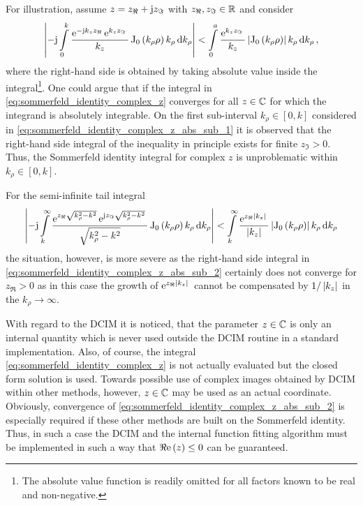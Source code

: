 For illustration, assume $z = z_\Re + \mathrm{j} z_\Im$ with $z_\Re, z_\Im \in \mathbb{R}$ and
consider
\begin{equation}\label{eq:sommerfeld_identity_complex_z_abs_sub_1}
	\left\vert
	-\mathrm{j}
	\int\limits_{0}^{k} 
	\frac{\mathrm{e}^{-\mathrm{j} k_z z_\Re}\, \mathrm{e}^{k_z z_\Im}\,}{k_z}
	\operatorname{J}_{0} \left(k_\rho \rho\right)
	k_\rho 
	\,
	\mathrm{d} k_\rho
	\right\vert
	<
	\int\limits_{0}^{a} 
	\frac{\mathrm{e}^{k_z z_\Im}\,}{k_z}
	\left\vert
	\operatorname{J}_{0} \left(k_\rho \rho\right)
	\right\vert
	k_\rho 
	\,
	\mathrm{d} k_\rho
	\, ,
\end{equation}
where the right-hand side is obtained by taking absolute value inside the
integral\footnote{The absolute value function is readily omitted for all factors
known to be real and non-negative.}.
One could argue that if the integral in
\eqref{eq:sommerfeld_identity_complex_z} converges for all $z \in \mathbb{C}$ for which
the integrand is absolutely integrable.
On the first sub-interval $k_\rho \in \left[0, k\right]$ considered in
\eqref{eq:sommerfeld_identity_complex_z_abs_sub_1} it is observed that 
the right-hand side integral of the inequality in principle exists
for finite $z_\Im > 0$.
Thus, the Sommerfeld identity integral for complex $z$ is unproblematic within
$k_\rho \in \left[0, k\right]$.

For the semi-infinite tail integral
\begin{equation}\label{eq:sommerfeld_identity_complex_z_abs_sub_2}
	\left\vert
	-\mathrm{j}
	\int\limits_{k}^{\infty} 
	\frac{
		\mathrm{e}^{z_\Re\sqrt{k_\rho^2 - k^2}}\,
		\mathrm{e}^{\mathrm{j} z_\Im \sqrt{k_\rho^2 - k^2}}\,
		}{\sqrt{k_\rho^2 - k^2}}
	\operatorname{J}_{0} \left(k_\rho \rho\right)
	k_\rho 
	\,
	\mathrm{d} k_\rho
	\right\vert
	<
	\int\limits_{k}^{\infty} 
	\frac{\mathrm{e}^{z_\Re \left\vert k_z\right\vert}\,}{\left\vert k_z\right\vert}
	\left\vert
	\operatorname{J}_{0} \left(k_\rho \rho\right)
	\right\vert
	k_\rho 
	\,
	\mathrm{d} k_\rho
\end{equation}
the situation, however, is more severe as the right-hand side integral in
\eqref{eq:sommerfeld_identity_complex_z_abs_sub_2} certainly does not converge
for $z_\Re > 0$ as in this case the growth of $\mathrm{e}^{z_\Re \left\vert k_z\right\vert}\,$ cannot be
compensated by $1 / \left\vert k_z\right\vert$ in the $k_\rho \to \infty$.

With regard to the \ac{DCIM} it is noticed, that the parameter $z \in \mathbb{C}$
is only an internal quantity which is never used outside the \ac{DCIM} routine
in a standard implementation.
Also, of course, the integral \eqref{eq:sommerfeld_identity_complex_z} is not
actually evaluated but the closed form solution is used.
Towards possible use of complex images obtained by \ac{DCIM} within other
methods, however, $z \in \mathbb{C}$ may be used as an actual coordinate.
Obviously, convergence of \eqref{eq:sommerfeld_identity_complex_z_abs_sub_2} is
especially required if these other methods are built on the Sommerfeld identity.
Thus, in such a case the \ac{DCIM} and the internal function fitting algorithm
must be implemented in such a way that $\Re\mathrm{e}\left(z\right) \leq 0$ can be guaranteed.

